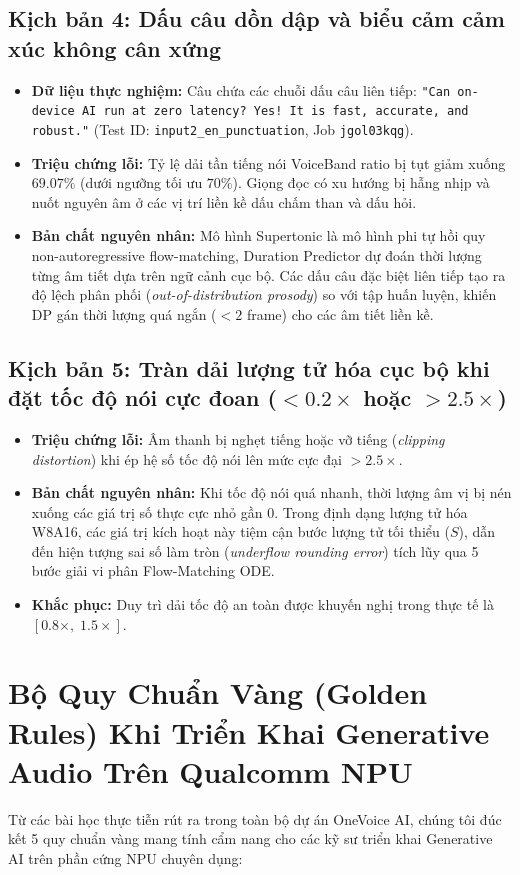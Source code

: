 \documentclass[11pt,a4paper,oneside,table]{report}
\begin{document}
\subsection{Kịch bản 4: Dấu câu dồn dập và biểu cảm cảm xúc không cân xứng}
\begin{itemize}
    \item \textbf{Dữ liệu thực nghiệm:} Câu chứa các chuỗi dấu câu liên tiếp: \texttt{"Can on-device AI run at zero latency? Yes! It is fast, accurate, and robust."} (Test ID: \texttt{input2\_en\_punctuation}, Job \texttt{jgol03kqg}).
    \item \textbf{Triệu chứng lỗi:} Tỷ lệ dải tần tiếng nói VoiceBand ratio bị tụt giảm xuống $\mathbf{69.07\%}$ (dưới ngưỡng tối ưu $70\%$). Giọng đọc có xu hướng bị hẫng nhịp và nuốt nguyên âm ở các vị trí liền kề dấu chấm than và dấu hỏi.
    \item \textbf{Bản chất nguyên nhân:} Mô hình Supertonic là mô hình phi tự hồi quy non-autoregressive flow-matching, Duration Predictor dự đoán thời lượng từng âm tiết dựa trên ngữ cảnh cục bộ. Các dấu câu đặc biệt liên tiếp tạo ra độ lệch phân phối (\textit{out-of-distribution prosody}) so với tập huấn luyện, khiến DP gán thời lượng quá ngắn ($< 2$ frame) cho các âm tiết liền kề.
\end{itemize}

\subsection{Kịch bản 5: Tràn dải lượng tử hóa cục bộ khi đặt tốc độ nói cực đoan ($< 0.2\times$ hoặc $> 2.5\times$)}
\begin{itemize}
    \item \textbf{Triệu chứng lỗi:} Âm thanh bị nghẹt tiếng hoặc vỡ tiếng (\textit{clipping distortion}) khi ép hệ số tốc độ nói lên mức cực đại $> 2.5\times$.
    \item \textbf{Bản chất nguyên nhân:} Khi tốc độ nói quá nhanh, thời lượng âm vị bị nén xuống các giá trị số thực cực nhỏ gần 0. Trong định dạng lượng tử hóa W8A16, các giá trị kích hoạt này tiệm cận bước lượng tử tối thiểu ($S$), dẫn đến hiện tượng sai số làm tròn (\textit{underflow rounding error}) tích lũy qua 5 bước giải vi phân Flow-Matching ODE.
    \item \textbf{Khắc phục:} Duy trì dải tốc độ an toàn được khuyến nghị trong thực tế là $[0.8\times, \; 1.5\times]$.
\end{itemize}

\section{Bộ Quy Chuẩn Vàng (Golden Rules) Khi Triển Khai Generative Audio Trên Qualcomm NPU}
Từ các bài học thực tiễn rút ra trong toàn bộ dự án OneVoice AI, chúng tôi đúc kết 5 quy chuẩn vàng mang tính cẩm nang cho các kỹ sư triển khai Generative AI trên phần cứng NPU chuyên dụng:
\end{document}
